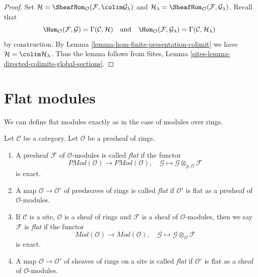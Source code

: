 \begin{proof}
Set $\mathcal{H} =
\SheafHom_\mathcal{O}(\mathcal{F}, \colim \mathcal{G}_\lambda)$
and $\mathcal{H}_\lambda =
\SheafHom_\mathcal{O}(\mathcal{F}, \mathcal{G}_\lambda)$.
Recall that
$$
\Hom_\mathcal{O}(\mathcal{F}, \mathcal{G}) = \Gamma(\mathcal{C}, \mathcal{H})
\quad\text{and}\quad
\Hom_\mathcal{O}(\mathcal{F}, \mathcal{G}_\lambda) =
\Gamma(\mathcal{C}, \mathcal{H}_\lambda)
$$
by construction. By Lemma \ref{lemma-hom-finite-presentation-colimit} we have
$\mathcal{H} = \colim \mathcal{H}_\lambda$. Thus the lemma follows from
Sites, Lemma \ref{sites-lemma-directed-colimits-global-sections}.
\end{proof}









\section{Flat modules}
\label{section-flat}

\noindent
We can define flat modules exactly as in the case of modules over rings.

\begin{definition}
\label{definition-flat}
Let $\mathcal{C}$ be a category.
Let $\mathcal{O}$ be a presheaf of rings.
\begin{enumerate}
\item A presheaf $\mathcal{F}$ of $\mathcal{O}$-modules is called
{\it flat} if the functor
$$
\textit{PMod}(\mathcal{O})
\longrightarrow
\textit{PMod}(\mathcal{O}), \quad
\mathcal{G} \mapsto \mathcal{G} \otimes_{p, \mathcal{O}} \mathcal{F}
$$
is exact.
\item A map $\mathcal{O} \to \mathcal{O}'$ of presheaves of rings
is called {\it flat} if $\mathcal{O}'$ is flat as a presheaf of
$\mathcal{O}$-modules.
\item If $\mathcal{C}$ is a site, $\mathcal{O}$ is a sheaf of rings
and $\mathcal{F}$ is a sheaf of $\mathcal{O}$-modules, then we
say $\mathcal{F}$ is {\it flat} if the functor
$$
\textit{Mod}(\mathcal{O})
\longrightarrow
\textit{Mod}(\mathcal{O}), \quad
\mathcal{G} \mapsto \mathcal{G} \otimes_\mathcal{O} \mathcal{F}
$$
is exact.
\item A map $\mathcal{O} \to \mathcal{O}'$ of sheaves of rings on a site
is called {\it flat} if $\mathcal{O}'$ is flat as a sheaf of
$\mathcal{O}$-modules.
\end{enumerate}
\end{definition}

